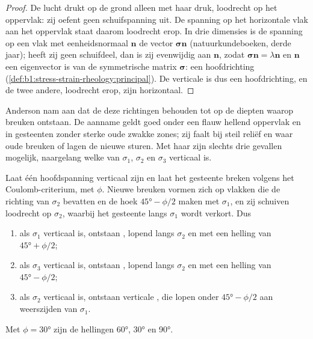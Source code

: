 \begin{proof}
De lucht drukt op de grond alleen met haar druk, loodrecht op het oppervlak: zij oefent geen schuifspanning uit. De spanning op het horizontale vlak aan het oppervlak staat daarom loodrecht erop. In drie dimensies is de spanning op een vlak met eenheidsnormaal $\mathbf n$ de vector $\boldsymbol\sigma\mathbf n$ (natuurkundeboeken, derde jaar); heeft zij geen schuifdeel, dan is zij evenwijdig aan $\mathbf n$, zodat $\boldsymbol\sigma\mathbf n = \lambda\mathbf n$ en $\mathbf n$ een eigenvector is van de symmetrische matrix $\boldsymbol\sigma$: een hoofdrichting (\cref{def:b1:stress-strain-rheology:principal}). De verticale is dus een hoofdrichting, en de twee andere, loodrecht erop, zijn horizontaal.
\end{proof}

Anderson nam aan dat de  deze richtingen behouden tot op de diepten waarop breuken ontstaan. De aanname geldt goed onder een flauw hellend oppervlak en in gesteenten zonder sterke oude zwakke zones; zij faalt bij steil reliëf en waar oude breuken of lagen de nieuwe sturen. Met haar zijn slechts drie gevallen mogelijk, naargelang welke van $\sigma_1$, $\sigma_2$ en $\sigma_3$ verticaal is.

\begin{theorem}\label{thm:b1:faults-folds-fabrics:anderson}
Laat één hoofdspanning verticaal zijn en laat het gesteente breken volgens het Coulomb-criterium, met  $\phi$. Nieuwe breuken vormen zich op vlakken die de richting van $\sigma_2$ bevatten en de hoek $\ang{45} - \phi/2$ maken met $\sigma_1$, en zij schuiven loodrecht op $\sigma_2$, waarbij het gesteente langs $\sigma_1$ wordt verkort. Dus
\begin{enumerate}[label=(\alph*)]
  \item als $\sigma_1$ verticaal is, ontstaan , lopend langs $\sigma_2$ en met een helling van $\ang{45} + \phi/2$;
  \item als $\sigma_3$ verticaal is, ontstaan , lopend langs $\sigma_2$ en met een helling van $\ang{45} - \phi/2$;
  \item als $\sigma_2$ verticaal is, ontstaan verticale , die lopen onder $\ang{45} - \phi/2$ aan weerszijden van $\sigma_1$.
\end{enumerate}
Met $\phi = \ang{30}$ zijn de hellingen \ang{60}, \ang{30} en \ang{90}.
\end{theorem}

